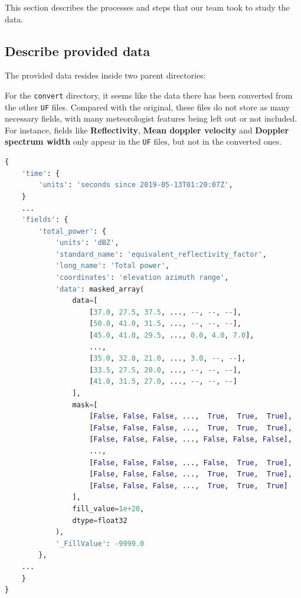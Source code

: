 This section describes the processes and steps that our team took to study the data.

\subsection{Describe provided data}

The provided data resides inside two parent directories:



For the \texttt{convert} directory, it seems like the data there has been converted from the other \texttt{UF} files.
Compared with the original, these files do not store as many necessary fields,
with many meteorologist features being left out or not included.
For instance, fields like \textbf{Reflectivity}, \textbf{Mean doppler velocity} and \textbf{Doppler spectrum width} only appear
in the \texttt{UF} files, but not in the converted ones.

\begin{lstlisting}[language=python,caption={A sample of metadata extracted from UF file}]
{
    'time': {
        'units': 'seconds since 2019-05-13T01:20:07Z',
    }
    ...
    'fields': {
        'total_power': {
            'units': 'dBZ',
            'standard_name': 'equivalent_reflectivity_factor',
            'long_name': 'Total power',
            'coordinates': 'elevation azimuth range',
            'data': masked_array(
                data=[
                    [37.0, 27.5, 37.5, ..., --, --, --],
                    [50.0, 41.0, 31.5, ..., --, --, --],
                    [45.0, 41.0, 29.5, ..., 0.0, 4.0, 7.0],
                    ...,
                    [35.0, 32.0, 21.0, ..., 3.0, --, --],
                    [33.5, 27.5, 20.0, ..., --, --, --],
                    [41.0, 31.5, 27.0, ..., --, --, --]
                ],
                mask=[
                    [False, False, False, ...,  True,  True,  True],
                    [False, False, False, ...,  True,  True,  True],
                    [False, False, False, ..., False, False, False],
                    ...,
                    [False, False, False, ..., False,  True,  True],
                    [False, False, False, ...,  True,  True,  True],
                    [False, False, False, ...,  True,  True,  True]
                ],
                fill_value=1e+20,
                dtype=float32
            ),
            '_FillValue': -9999.0
        },
    ...
    }
}
\end{lstlisting}


